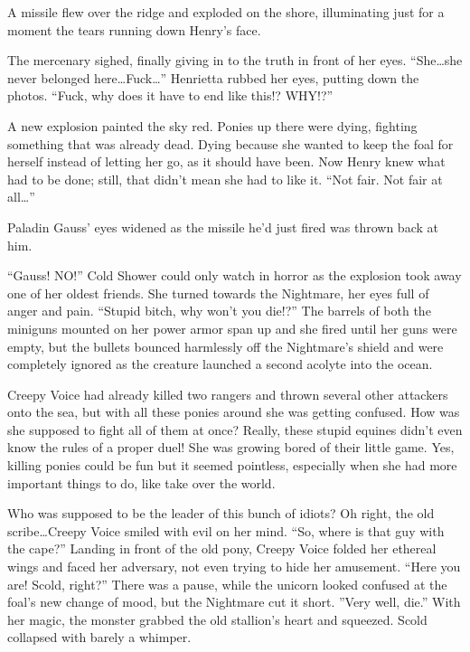 \medskip

A missile flew over the ridge and exploded on the shore, illuminating just for a moment the tears running down Henry's face.

The mercenary sighed, finally giving in to the truth in front of her eyes. ``She\dots she never belonged here\dots Fuck\dots'' Henrietta rubbed her eyes, putting down the photos. ``Fuck, why does it have to end like this!? WHY!?''

A new explosion painted the sky red. Ponies up there were dying, fighting something that was already dead. Dying because she wanted to keep the foal for herself instead of letting her go, as it should have been. Now Henry knew what had to be done; still, that didn't mean she had to like it. ``Not fair. Not fair at all\dots''

\horizonline

Paladin Gauss' eyes widened as the missile he'd just fired was thrown back at him.

``Gauss! NO!'' Cold Shower could only watch in horror as the explosion took away one of her oldest friends. She turned towards the Nightmare, her eyes full of anger and pain. ``Stupid bitch, why won't you die!?'' The barrels of both the miniguns mounted on her power armor span up and she fired until her guns were empty, but the bullets bounced harmlessly off the Nightmare's shield and were completely ignored as the creature launched a second acolyte into the ocean.

Creepy Voice had already killed two rangers and thrown several other attackers onto the sea, but with all these ponies around she was getting confused. How was she supposed to fight all of them at once? Really, these stupid equines didn't even know the rules of a proper duel! She was growing bored of their little game. Yes, killing ponies could be fun but it seemed pointless, especially when she had more important things to do, like take over the world.

Who was supposed to be the leader of this bunch of idiots? Oh right, the old scribe\dots Creepy Voice smiled with evil on her mind. ``So, where is that guy with the cape?'' Landing in front of the old pony, Creepy Voice folded her ethereal wings and faced her adversary, not even trying to hide her amusement. ``Here you are! Scold, right?'' There was a pause, while the unicorn looked confused at the foal's new change of mood, but the Nightmare cut it short. ''Very well, die.'' With her magic, the monster grabbed the old stallion's heart and squeezed. Scold collapsed with barely a whimper.

